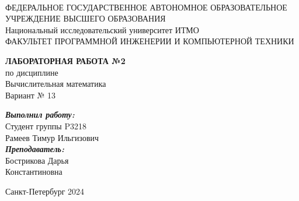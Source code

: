 \documentclass[14pt]{article}
\begin{document}
\begin{spacing}{1}
\begin{center}
	 \\
	\vspace{5mm}
	ФЕДЕРАЛЬНОЕ ГОСУДАРСТВЕННОЕ АВТОНОМНОЕ ОБРАЗОВАТЕЛЬНОЕ \\ УЧРЕЖДЕНИЕ ВЫСШЕГО ОБРАЗОВАНИЯ  \\
	\guillemotleft Национальный исследовательский университет ИТМО\guillemotright \\
	\vspace{5mm}
	ФАКУЛЬТЕТ ПРОГРАММНОЙ ИНЖЕНЕРИИ И КОМПЬЮТЕРНОЙ ТЕХНИКИ
	\vspace{60mm}
	
	{\bf \LARGE ЛАБОРАТОРНАЯ РАБОТА №2} \\
	{ \Large по дисциплине \\
	\guillemotleft Вычислительная математика\guillemotright \\
	Вариант № 13}\\
\end{center}
\vspace{50mm}

\begin{flushright}
	{\it \textbf{Выполнил работу:}}\\
	Студент группы P3218 \\
	Рамеев Тимур Ильгизович \\
	{\it \textbf{Преподаватель:}}\\
	Бострикова Дарья \\
	Константиновна \\
\end{flushright}
\vspace{18mm}
\end{spacing}
\begin{center}
    Санкт-Петербург  2024
\end{center}


\newpage
\begin{center}
	\tableofcontents 
\end{center}
\setcounter{page}{1}
\end{document}
